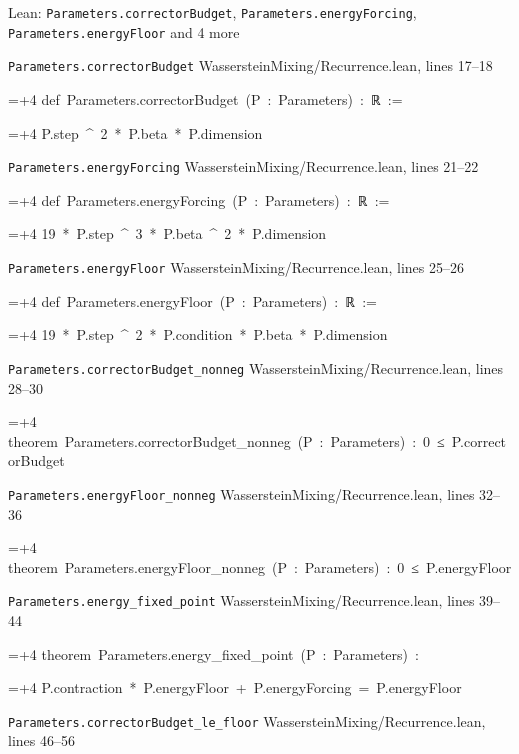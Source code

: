 \documentclass[11pt,a4paper]{article}
\newlength{\leancharwidth}
\newenvironment{leancode}{\par\smallskip\begingroup\ttfamily\footnotesize\raggedright
  \settowidth{\leancharwidth}{M}\setlength{\parskip}{0pt}\setlength{\parindent}{0pt}
  \frenchspacing}{\par\endgroup\smallskip}
\newcommand{\leanline}[2]{\hangindent=\dimexpr#1\leancharwidth+4\leancharwidth\relax
  \hangafter=1\noindent\hspace*{#1\leancharwidth}#2\par}
\newcommand{\leansource}[1]{\par{\footnotesize\color{leanmuted}#1}\par}
\begin{document}
\begin{leanbox}{Lean: \texttt{Parameters.\allowbreak{}correctorBudget}, \texttt{Parameters.\allowbreak{}energyForcing}, \texttt{Parameters.\allowbreak{}energyFloor} and 4 more}
\leansource{\texttt{Parameters.\allowbreak{}correctorBudget} \quad WassersteinMixing/\allowbreak{}Recurrence.lean, lines 17–18}
\begin{leancode}
\leanline{0}{def\ Parameters.correctorBudget\ (P\ :\ Parameters)\ :\ ℝ\ :=}
\leanline{2}{P.step\ \textasciicircum{}\ 2\ *\ P.beta\ *\ P.dimension}
\end{leancode}
\leansource{\texttt{Parameters.\allowbreak{}energyForcing} \quad WassersteinMixing/\allowbreak{}Recurrence.lean, lines 21–22}
\begin{leancode}
\leanline{0}{def\ Parameters.energyForcing\ (P\ :\ Parameters)\ :\ ℝ\ :=}
\leanline{2}{19\ *\ P.step\ \textasciicircum{}\ 3\ *\ P.beta\ \textasciicircum{}\ 2\ *\ P.dimension}
\end{leancode}
\leansource{\texttt{Parameters.\allowbreak{}energyFloor} \quad WassersteinMixing/\allowbreak{}Recurrence.lean, lines 25–26}
\begin{leancode}
\leanline{0}{def\ Parameters.energyFloor\ (P\ :\ Parameters)\ :\ ℝ\ :=}
\leanline{2}{19\ *\ P.step\ \textasciicircum{}\ 2\ *\ P.condition\ *\ P.beta\ *\ P.dimension}
\end{leancode}
\leansource{\texttt{Parameters.\allowbreak{}correctorBudget\_\allowbreak{}nonneg} \quad WassersteinMixing/\allowbreak{}Recurrence.lean, lines 28–30}
\begin{leancode}
\leanline{0}{theorem\ Parameters.correctorBudget\_nonneg\ (P\ :\ Parameters)\ :\ 0\ ≤\ P.correctorBudget}
\end{leancode}
\leansource{\texttt{Parameters.\allowbreak{}energyFloor\_\allowbreak{}nonneg} \quad WassersteinMixing/\allowbreak{}Recurrence.lean, lines 32–36}
\begin{leancode}
\leanline{0}{theorem\ Parameters.energyFloor\_nonneg\ (P\ :\ Parameters)\ :\ 0\ ≤\ P.energyFloor}
\end{leancode}
\leansource{\texttt{Parameters.\allowbreak{}energy\_\allowbreak{}fixed\_\allowbreak{}point} \quad WassersteinMixing/\allowbreak{}Recurrence.lean, lines 39–44}
\begin{leancode}
\leanline{0}{theorem\ Parameters.energy\_fixed\_point\ (P\ :\ Parameters)\ :}
\leanline{4}{P.contraction\ *\ P.energyFloor\ +\ P.energyForcing\ =\ P.energyFloor}
\end{leancode}
\leansource{\texttt{Parameters.\allowbreak{}correctorBudget\_\allowbreak{}le\_\allowbreak{}floor} \quad WassersteinMixing/\allowbreak{}Recurrence.lean, lines 46–56}

\end{leanbox}
\end{document}
